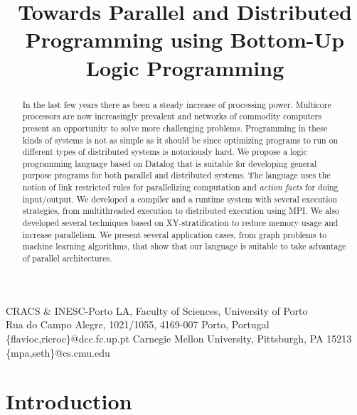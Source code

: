 \documentclass[preprint]{sigplanconf}
\begin{document}
\copyrightdata{[to be supplied]} 


\title{Towards Parallel and Distributed Programming using Bottom-Up Logic Programming}

           {CRACS \& INESC-Porto LA, Faculty of Sciences, University of Porto\\
                  Rua do Campo Alegre, 1021/1055, 4169-007 Porto, Portugal}
           {\{flavioc,ricroc\}@dcc.fc.up.pt}
           {Carnegie Mellon University, Pittsburgh, PA 15213}
           {\{mpa,seth\}@cs.cmu.edu}

\maketitle

\begin{abstract}
In the last few years there as been a steady increase of processing power.
Multicore processors are now increasingly prevalent and networks of commodity computers
present an opportunity to solve more challenging problems. Programming in these kinds of
systems is not as simple as it should be since optimizing programs to run on
different types of distributed systems is notoriously hard.
We propose a logic programming language based on Datalog
that is suitable for developing general purpose programs for
both parallel and distributed systems. The language uses the notion of
link restricted rules for parallelizing computation
and \emph{action facts} for doing input/output.
We developed a compiler and a runtime system with several execution strategies,
from multithreaded execution to distributed execution using MPI. We also
developed several techniques based on XY-stratification to reduce memory usage
and increase parallelism. We present several application cases, from graph
problems to machine learning algorithms, that show that our language is
suitable to take advantage of parallel architectures.
\end{abstract}


\terms

\keywords

\section{Introduction}
\end{document}
